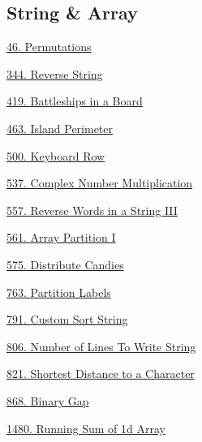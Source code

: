 \subsection*{String \& Array}
\begin{flushleft}
    \hyperref[algo:46]{46. Permutations}

    \hyperref[algo:344]{344. Reverse String}

    \hyperref[algo:419]{419. Battleships in a Board}
    
    \hyperref[algo:463]{463. Island Perimeter}

    \hyperref[algo:500]{500. Keyboard Row}

    \hyperref[algo:537]{537. Complex Number Multiplication}

    \hyperref[algo:557]{557. Reverse Words in a String III}

    \hyperref[algo:561]{561. Array Partition I}

    \hyperref[algo:575]{575. Distribute Candies}

    \hyperref[algo:763]{763. Partition Labels}

    \hyperref[algo:791]{791. Custom Sort String}

    \hyperref[algo:806]{806. Number of Lines To Write String}

    \hyperref[algo:821]{821. Shortest Distance to a Character}
    
    \hyperref[algo:868]{868. Binary Gap}

    \hyperref[algo:1480]{1480. Running Sum of 1d Array}
\end{flushleft}
